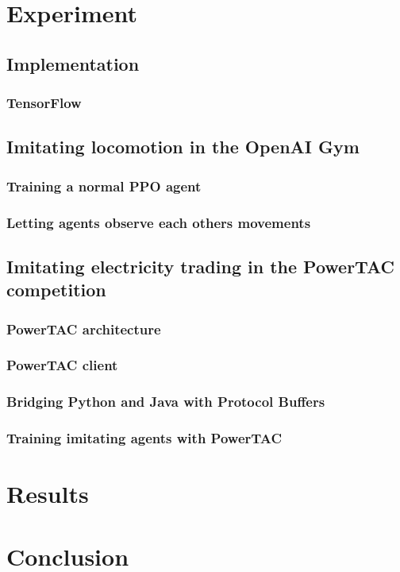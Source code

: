 \chapter{Experiment}

\section{Implementation}
\subsection{TensorFlow}

\section{Imitating locomotion in the OpenAI Gym}
\subsection{Training a normal PPO agent}
\subsection{Letting agents observe each others movements}

\section{Imitating electricity trading in the PowerTAC competition}
\subsection{PowerTAC architecture}
\subsection{PowerTAC client}
\subsection{Bridging Python and Java with Protocol Buffers}
\subsection{Training imitating agents with PowerTAC}






\chapter{Results}

\chapter{Conclusion}
